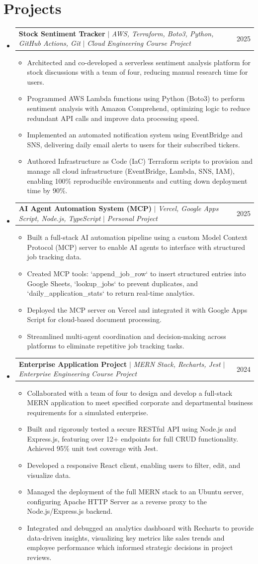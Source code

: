 \documentclass[letterpaper,11pt]{article}
\makeatletter
\newcommand{\resumeItem}[1]{
  \item\small{
    {#1 \vspace{-2pt}}
  }
}
\newcommand{\resumeProjectHeading}[2]{
    \item
    \begin{tabular*}{0.97\textwidth}{l@{\extracolsep{\fill}}r}
      \small#1 & #2 \\
    \end{tabular*}\vspace{-7pt}
}
\newcommand{\resumeSubHeadingListStart}{\begin{itemize}[leftmargin=0.15in, label={}]}\newcommand{\resumeSubHeadingListEnd}{\end{itemize}}
\newcommand{\resumeItemListStart}{\begin{itemize}}
\newcommand{\resumeItemListEnd}{\end{itemize}\vspace{-5pt}}
\makeatother
\begin{document}
\section{Projects}
    \resumeSubHeadingListStart
    \resumeProjectHeading
    {\textbf{Stock Sentiment Tracker} $|$ \emph{AWS, Terraform, Boto3, Python, GitHub Actions, Git} $|$ \emph{Cloud Engineering Course Project}}{2025}
    \resumeItemListStart
        \resumeItem{Architected and co-developed a serverless sentiment analysis platform for stock discussions with a team of four, reducing manual research time for users.}
        \resumeItem{Programmed AWS Lambda functions using Python (Boto3) to perform sentiment analysis with Amazon Comprehend, optimizing logic to reduce redundant API calls and improve data processing speed.}
        \resumeItem{Implemented an automated notification system using EventBridge and SNS, delivering daily email alerts to users for their subscribed tickers.}
        \resumeItem{Authored Infrastructure as Code (IaC) Terraform scripts to provision and manage all cloud infrastructure (EventBridge, Lambda, SNS, IAM), enabling 100\% reproducible environments and cutting down deployment time by 90\%.}
    \resumeItemListEnd
    \resumeProjectHeading
        {\textbf{AI Agent Automation System (MCP)} $|$ \emph{Vercel, Google Apps Script, Node.js, TypeScript} $|$ \emph{Personal Project}}{2025}
        \resumeItemListStart
            \resumeItem{Built a full-stack AI automation pipeline using a custom Model Context Protocol (MCP) server to enable AI agents to interface with structured job tracking data.}
            \resumeItem{Created MCP tools: `append\_job\_row` to insert structured entries into Google Sheets, `lookup\_jobs` to prevent duplicates, and `daily\_application\_stats` to return real-time analytics.}
            \resumeItem{Deployed the MCP server on Vercel and integrated it with Google Apps Script for cloud-based document processing.}
            \resumeItem{Streamlined multi-agent coordination and decision-making across platforms to eliminate repetitive job tracking tasks.}
        \resumeItemListEnd
      \resumeProjectHeading
          {\textbf{Enterprise Application Project} $|$ \emph{MERN Stack, Recharts, Jest} $|$ \emph{Enterprise Engineering Course Project}}{2024}
          \resumeItemListStart
            \resumeItem{Collaborated with a team of four to design and develop a full-stack MERN application to meet specified corporate and departmental business requirements for a simulated enterprise.}
            \resumeItem{Built and rigorously tested a secure RESTful API using Node.js and Express.js, featuring over 12+ endpoints for full CRUD functionality. Achieved 95\% unit test coverage with Jest.}
            \resumeItem{Developed a responsive React client, enabling users to filter, edit, and visualize data.}
            \resumeItem{Managed the deployment of the full MERN stack to an Ubuntu server, configuring Apache HTTP Server as a reverse proxy to the Node.js/Express.js backend.}
            \resumeItem{Integrated and debugged an analytics dashboard with Recharts to provide data-driven insights, visualizing key metrics like sales trends and employee performance which informed strategic decisions in project reviews.}
          \resumeItemListEnd
      \resumeSubHeadingListEnd 
\end{document}
